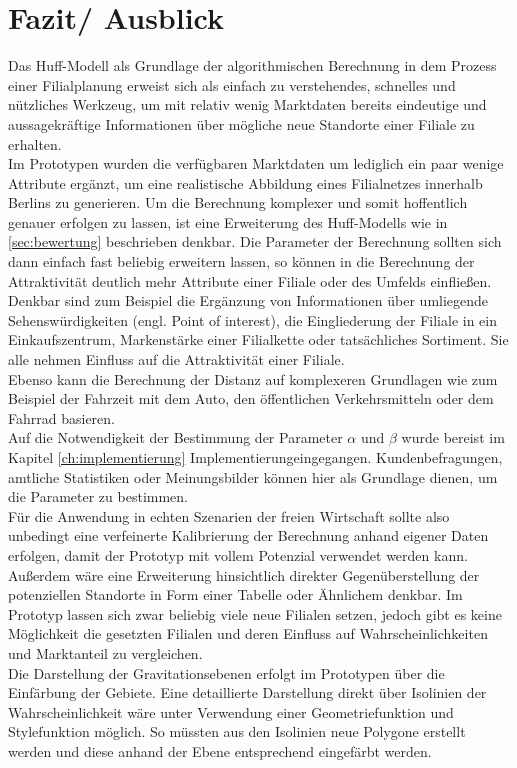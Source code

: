 \section{Fazit/ Ausblick}
Das Huff-Modell als Grundlage der algorithmischen Berechnung in dem Prozess einer Filialplanung erweist sich als einfach zu verstehendes, schnelles und nützliches Werkzeug, um mit relativ wenig Marktdaten bereits eindeutige und aussagekräftige Informationen über mögliche neue Standorte einer Filiale zu erhalten.\\
Im Prototypen wurden die verfügbaren Marktdaten um lediglich ein paar wenige Attribute ergänzt, um eine realistische Abbildung eines Filialnetzes innerhalb Berlins zu generieren. 
Um die Berechnung komplexer und somit hoffentlich genauer erfolgen zu lassen, ist eine Erweiterung des Huff-Modells wie in \ref{sec:bewertung} beschrieben denkbar.
Die Parameter der Berechnung sollten sich dann einfach fast beliebig erweitern lassen, so können in die Berechnung der Attraktivität deutlich mehr Attribute einer Filiale oder des Umfelds einfließen.
Denkbar sind zum Beispiel die Ergänzung von Informationen über umliegende Sehenswürdigkeiten (engl. Point of interest), die Eingliederung der Filiale in ein Einkaufszentrum, Markenstärke einer Filialkette oder tatsächliches Sortiment.
Sie alle nehmen Einfluss auf die Attraktivität einer Filiale.\\
Ebenso kann die Berechnung der Distanz auf komplexeren Grundlagen wie zum Beispiel der Fahrzeit mit dem Auto, den öffentlichen Verkehrsmitteln oder dem Fahrrad basieren.\\
Auf die Notwendigkeit der Bestimmung der Parameter $\alpha$ und $\beta$ wurde bereist im Kapitel \ref{ch:implementierung} \glqq Implementierung\glqq eingegangen.
Kundenbefragungen, amtliche Statistiken oder Meinungsbilder können hier als Grundlage dienen, um die Parameter zu bestimmen.\\
Für die Anwendung in echten Szenarien der freien Wirtschaft sollte also unbedingt eine verfeinerte Kalibrierung der Berechnung anhand eigener Daten erfolgen, damit der Prototyp mit vollem Potenzial verwendet werden kann.\\
Außerdem wäre eine Erweiterung hinsichtlich direkter Gegenüberstellung der potenziellen Standorte in Form einer Tabelle oder Ähnlichem denkbar.
Im Prototyp lassen sich zwar beliebig viele neue Filialen setzen, jedoch gibt es keine Möglichkeit die gesetzten Filialen und deren Einfluss auf Wahrscheinlichkeiten und Marktanteil zu vergleichen.\\
Die Darstellung der Gravitationsebenen erfolgt im Prototypen über die Einfärbung der Gebiete.
Eine detaillierte Darstellung direkt über Isolinien der Wahrscheinlichkeit wäre unter Verwendung einer Geometriefunktion und Stylefunktion möglich. 
So müssten aus den Isolinien neue Polygone erstellt werden und diese anhand der Ebene entsprechend eingefärbt werden.

